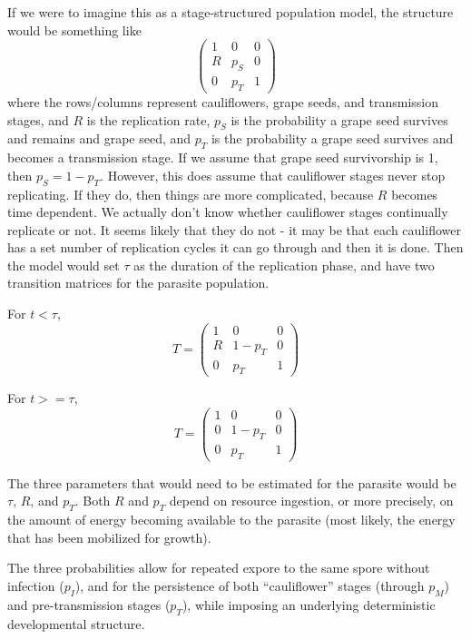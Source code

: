\documentclass[11pt,reqno,final,pdftex]{amsart}\usepackage[]{graphicx}\usepackage[]{color}
\theoremstyle{plain}
\numberwithin{equation}{part}
\begin{document}
If we were to imagine this as a stage-structured population model, the
structure would be something like
\begin{equation}
\begin{pmatrix}
1 & 0 & 0 \\
R & p_S & 0 \\
0 & p_T & 1
\end{pmatrix}
\end{equation}
where the rows/columns represent cauliflowers, grape seeds, and
transmission stages, and $R$ is the replication rate, $p_S$ is the
probability a grape seed survives and remains and grape seed, and
$p_T$ is the probability a grape seed survives and becomes a
transmission stage.
If we assume that grape seed survivorship is 1, then $p_S = 1-p_T$.
However, this does assume that cauliflower stages never stop
replicating.
If they do, then things are more complicated, because $R$ becomes time
dependent.
We actually don't know whether cauliflower stages continually
replicate or not. It seems likely that they do not - it may be that
each cauliflower has a set number of replication cycles it can go
through and then it is done.
Then the model would set $\tau$ as the duration of the replication
phase, and have two transition matrices for the parasite population.

For $t < \tau$,
\begin{equation}
T =
\begin{pmatrix}
1 & 0 & 0 \\
R & 1-p_T & 0 \\
0 & p_T & 1
\end{pmatrix}
\end{equation}

For $t >= \tau$,
\begin{equation}
T =
\begin{pmatrix}
1 & 0 & 0 \\
0 & 1-p_T & 0 \\
0 & p_T & 1
\end{pmatrix}
\end{equation}

The three parameters that would need to be estimated for the parasite
would be $\tau$, $R$, and $p_T$.
Both $R$ and $p_T$ depend on resource ingestion, or more
precisely, on the amount of energy becoming available to the
parasite (most likely, the energy that has been mobilized for growth).

The three probabilities allow for repeated expore to the same spore without infection ($p_I$), and for the persistence of both ``cauliflower'' stages (through $p_M$) and pre-transmission stages ($p_T$), while imposing an underlying deterministic developmental structure.
\end{document}
